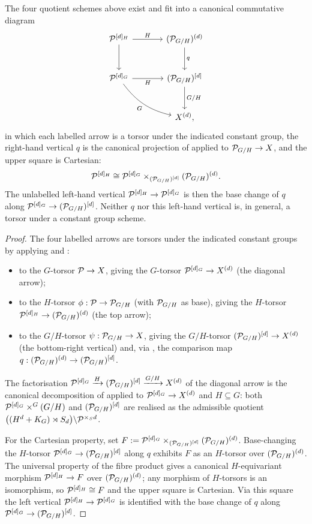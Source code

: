 \documentclass[11pt]{article}
\begin{document}
\begin{prop}\label{prop:torsor_tower_diagram}
The four quotient schemes above exist and fit into a canonical commutative
diagram
\[
\begin{tikzcd}[row sep=large, column sep=large]
    \cP^{[d]_H} \arrow[r, "H"] \arrow[d] & (\cP_{G/H})^{(d)} \arrow[d, "q"] \\
    \cP^{[d]_G} \arrow[r, "H"'] \arrow[dr, "G"', bend right=20] & (\cP_{G/H})^{[d]} \arrow[d, "G/H"] \\
    & X^{(d)},
\end{tikzcd}
\]
in which each labelled arrow is a torsor under the indicated constant group, the
right-hand vertical $q$ is the canonical projection of
 applied to $\mathcal{P}_{G/H} \to X$, and the upper square
is Cartesian:
\[
\mathcal{P}^{[d]_H} \cong \mathcal{P}^{[d]_G} \times_{(\mathcal{P}_{G/H})^{[d]}} (\mathcal{P}_{G/H})^{(d)}.
\]
The unlabelled left-hand vertical $\mathcal{P}^{[d]_H} \to \mathcal{P}^{[d]_G}$ is then the base
change of $q$ along $\mathcal{P}^{[d]_G} \to (\mathcal{P}_{G/H})^{[d]}$.  Neither $q$ nor this
left-hand vertical is, in general, a torsor under a constant group scheme.
\end{prop}
\begin{proof}
The four labelled arrows are torsors under the indicated constant groups by
applying  and
:
\begin{itemize}
    \item to the $G$-torsor $\mathcal{P} \to X$, giving the $G$-torsor
          $\mathcal{P}^{[d]_G} \to X^{(d)}$ (the diagonal arrow);
    \item to the $H$-torsor $\phi : \mathcal{P} \to \mathcal{P}_{G/H}$ (with $\mathcal{P}_{G/H}$ as
          base), giving the $H$-torsor $\mathcal{P}^{[d]_H} \to (\mathcal{P}_{G/H})^{(d)}$
          (the top arrow);
    \item to the $G/H$-torsor $\psi : \mathcal{P}_{G/H} \to X$, giving the $G/H$-torsor
          $(\mathcal{P}_{G/H})^{[d]} \to X^{(d)}$ (the bottom-right vertical) and, via
          , the comparison map
          $q : (\mathcal{P}_{G/H})^{(d)} \to (\mathcal{P}_{G/H})^{[d]}$.
\end{itemize}
The factorisation $\mathcal{P}^{[d]_G} \xrightarrow{H} (\mathcal{P}_{G/H})^{[d]} \xrightarrow{G/H} X^{(d)}$
of the diagonal arrow is the canonical decomposition of
 applied to $\mathcal{P}^{[d]_G} \to X^{(d)}$ and
$H \subseteq G$: both $\mathcal{P}^{[d]_G} \times^G (G/H)$ and $(\mathcal{P}_{G/H})^{[d]}$ are
realised as the admissible quotient
$\bigl((H^d + K_{G})\rtimes S_d\bigr)\backslash \mathcal{P}^{\times_S d}$.

For the Cartesian property, set
$F := \mathcal{P}^{[d]_G} \times_{(\mathcal{P}_{G/H})^{[d]}} (\mathcal{P}_{G/H})^{(d)}$.  Base-changing
the $H$-torsor $\mathcal{P}^{[d]_G} \to (\mathcal{P}_{G/H})^{[d]}$ along $q$ exhibits $F$ as an
$H$-torsor over $(\mathcal{P}_{G/H})^{(d)}$.  The universal property of the fibre
product gives a canonical $H$-equivariant morphism $\mathcal{P}^{[d]_H} \to F$ over
$(\mathcal{P}_{G/H})^{(d)}$; any morphism of $H$-torsors is an isomorphism, so
$\mathcal{P}^{[d]_H} \cong F$ and the upper square is Cartesian.  Via this square the
left vertical $\mathcal{P}^{[d]_H} \to \mathcal{P}^{[d]_G}$ is identified with the base change
of $q$ along $\mathcal{P}^{[d]_G} \to (\mathcal{P}_{G/H})^{[d]}$.
\end{proof}
\end{document}
